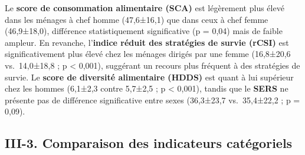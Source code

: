 \documentclass[
]{article}
\begin{document}
Le \textbf{score de consommation alimentaire (SCA)} est légèrement plus
élevé dans les ménages à chef homme (47,6±16,1) que dans ceux à chef
femme (46,9±18,0), différence statistiquement significative (p = 0,04)
mais de faible ampleur. En revanche, l'\textbf{indice réduit des
stratégies de survie (rCSI)} est significativement plus élevé chez les
ménages dirigés par une femme (16,8±20,6 vs.~14,0±18,8 ; p \textless{}
0,001), suggérant un recours plus fréquent à des stratégies de survie.
Le \textbf{score de diversité alimentaire (HDDS)} est quant à lui
supérieur chez les hommes (6,1±2,3 contre 5,7±2,5 ; p \textless{}
0,001), tandis que le \textbf{SERS} ne présente pas de différence
significative entre sexes (36,3±23,7 vs.~35,4±22,2 ; p = 0,09).

\hypertarget{iii-3.-comparaison-des-indicateurs-catuxe9goriels}{%
\subsection{III-3. Comparaison des indicateurs
catégoriels}\label{iii-3.-comparaison-des-indicateurs-catuxe9goriels}}
\end{document}
